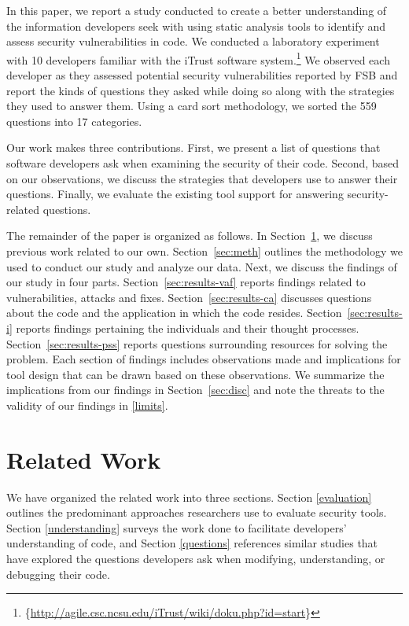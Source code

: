 \documentclass[conference]{IEEEtran}
\newcommand{\blind}[1]{{\color{white}\{#1\}}}
\begin{document}
In this paper, we report a study conducted to create a better understanding of the information developers seek with using static analysis tools to identify and assess security vulnerabilities in code.
We conducted a laboratory experiment with 10 developers familiar with the iTrust software system.\footnote{\blind{\url{http://agile.csc.ncsu.edu/iTrust/wiki/doku.php?id=start}}} 
We observed each developer as they assessed potential security vulnerabilities reported by FSB and report the kinds of questions they asked while doing so along with the strategies they used to answer them.
Using a card sort methodology, we sorted the 559 questions into 17 categories. 

Our work makes three contributions. 
First, we present a list of questions that software developers ask when examining the security of their code.
Second, based on our observations, we discuss the strategies that developers use to answer their questions.
Finally, we evaluate the existing tool support for answering security-related questions.

The remainder of the paper is organized as follows. 
In Section~\ref{sec:rw}, we discuss previous work related to our own. 
Section~\ref{sec:meth} outlines the methodology we used to conduct our study and analyze our data. 
Next, we discuss the findings of our study in four parts. 
Section~\ref{sec:results-vaf} reports findings related to vulnerabilities, attacks and fixes. 
Section~\ref{sec:results-ca} discusses questions about the code and the application in which the code resides.
Section~\ref{sec:results-i} reports findings pertaining the individuals and their thought processes.
Section~\ref{sec:results-pss} reports questions surrounding resources for solving the problem.
Each section of findings includes observations made and implications for tool design that can be drawn based on these observations. 
We summarize the implications from our findings in Section~\ref{sec:disc} and note the threats to the validity of our findings in \ref{limits}.




\section{Related Work}
\label{sec:rw}

We have organized the related work into three sections. Section \ref{evaluation} outlines the predominant approaches researchers use to evaluate security tools. 
Section \ref{understanding} surveys the work done to facilitate developers' understanding of code, and Section \ref{questions} references similar studies that have explored the questions developers ask when modifying, understanding, or debugging their code.
\end{document}
